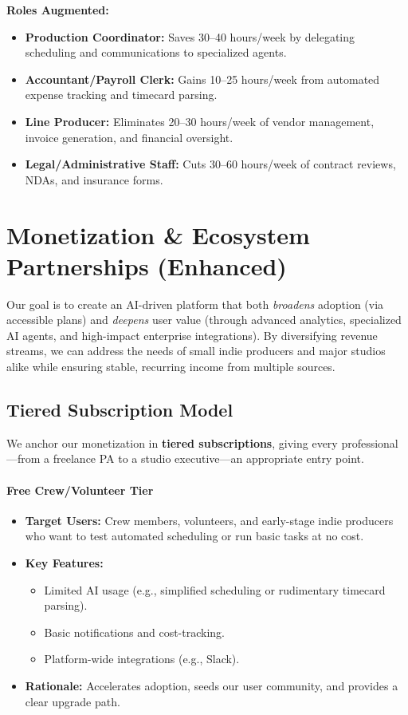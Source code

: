 \documentclass[11pt]{article}
\begin{document}
\noindent \textbf{Roles Augmented:}
\begin{itemize}
    \item \textbf{Production Coordinator:} Saves 30--40 hours/week by delegating scheduling and communications to specialized agents.
    \item \textbf{Accountant/Payroll Clerk:} Gains 10--25 hours/week from automated expense tracking and timecard parsing.
    \item \textbf{Line Producer:} Eliminates 20--30 hours/week of vendor management, invoice generation, and financial oversight.
    \item \textbf{Legal/Administrative Staff:} Cuts 30--60 hours/week of contract reviews, NDAs, and insurance forms.
\end{itemize}

\section{Monetization \& Ecosystem Partnerships (Enhanced)}
\label{sec:monetization}

Our goal is to create an AI-driven platform that both \textit{broadens} adoption (via accessible plans) and \textit{deepens} user value (through advanced analytics, specialized AI agents, and high-impact enterprise integrations). By diversifying revenue streams, we can address the needs of small indie producers and major studios alike while ensuring stable, recurring income from multiple sources.

\subsection{Tiered Subscription Model}
We anchor our monetization in \textbf{tiered subscriptions}, giving every professional—from a freelance PA to a studio executive—an appropriate entry point.

\paragraph{Free Crew/Volunteer Tier}
\begin{itemize}
    \item \textbf{Target Users:} Crew members, volunteers, and early-stage indie producers who want to test automated scheduling or run basic tasks at no cost.
    \item \textbf{Key Features:}
    \begin{itemize}
        \item Limited AI usage (e.g., simplified scheduling or rudimentary timecard parsing).
        \item Basic notifications and cost-tracking.
        \item Platform-wide integrations (e.g., Slack).
    \end{itemize}
    \item \textbf{Rationale:} Accelerates adoption, seeds our user community, and provides a clear upgrade path.
\end{itemize}
\end{document}
